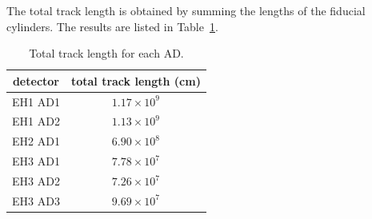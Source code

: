 The total track length is obtained by summing the lengths of the fiducial cylinders. The results are listed in Table~\ref{tab:total_track_length}.
\begin{table}[ht]
	\centering
	\begin{tabular}{|c|c|}
		\hline
		detector & total track length (cm) \\
		\hline
		EH1 AD1 & $1.17\times 10^9$ \\
		\hline
		EH1 AD2 & $1.13\times 10^9$ \\
		\hline
		EH2 AD1 & $6.90\times 10^8$ \\
		\hline
		EH3 AD1 & $7.78\times 10^7$ \\
		\hline
		EH3 AD2 & $7.26\times 10^7$ \\
		\hline
		EH3 AD3 & $9.69\times 10^7$ \\
		\hline
	\end{tabular}
	\caption{Total track length for each AD.}
	\label{tab:total_track_length}
\end{table}

